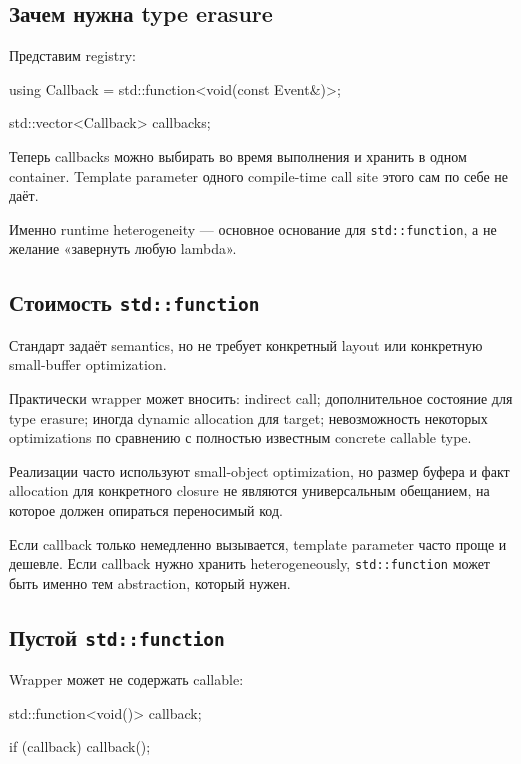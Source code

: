 \subsection{Зачем нужна type erasure}

Представим registry:

\begin{cppcode}
using Callback = std::function<void(const Event&)>;

std::vector<Callback> callbacks;
\end{cppcode}

Теперь callbacks можно выбирать во время выполнения и хранить в одном
container. Template parameter одного compile-time call site этого сам по себе
не даёт.

Именно runtime heterogeneity --- основное основание для
\texttt{std::function}, а не желание «завернуть любую lambda».

\subsection{Стоимость \texttt{std::function}}

Стандарт задаёт semantics, но не требует конкретный layout или конкретную
small-buffer optimization.

Практически wrapper может вносить:
indirect call; дополнительное состояние для type erasure; иногда dynamic allocation для target; невозможность некоторых optimizations по сравнению с полностью известным concrete callable type.

\begin{performancebox}
Реализации часто используют small-object optimization, но размер буфера и факт
allocation для конкретного closure не являются универсальным обещанием,
на которое должен опираться переносимый код.
\end{performancebox}

Если callback только немедленно вызывается, template parameter часто проще и
дешевле. Если callback нужно хранить heterogeneously, \texttt{std::function}
может быть именно тем abstraction, который нужен.

\subsection{Пустой \texttt{std::function}}

Wrapper может не содержать callable:

\begin{cppcode}
std::function<void()> callback;

if (callback) {
    callback();
}
\end{cppcode}

